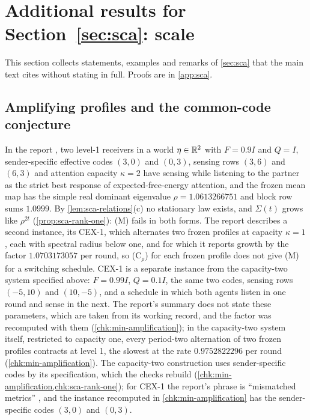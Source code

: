 \section{Additional results for \texorpdfstring{Section~\ref{sec:sca}}{Section 8}: scale}\label{sup:sca}

This section collects statements, examples and remarks of \cref{sec:sca} that the main text cites without stating in full. Proofs are in \cref{app:sca}.

\subsection{Amplifying profiles and the common-code conjecture}\label{sup:sca-amplifying-profiles-and-the-common-code}

\begin{example}\label{ex:sca-amplifying-profile}
In the report \citep{dennis2026communicating}, two level-1 receivers in a world $\eta\in\mathbb{R}^2$ with $F=0.9I$ and $Q=I$, sender-specific effective codes $(3,0)$ and $(0,3)$, sensing rows $(3,6)$ and $(6,3)$ and attention capacity $\kappa=2$ have sensing while listening to the partner as the strict best response of expected-free-energy attention, and the frozen mean map has the simple real dominant eigenvalue $\rho=1.0613266751$ and block row sums $1.0999$. By \cref{lem:sca-relations}(c) no stationary law exists, and $\Sigma(t)$ grows like $\rho^{2t}$ (\cref{prop:sca-rank-one}): \textup{(M)} fails in both forms. The report describes a second instance, its CEX-1, which alternates two frozen profiles at capacity $\kappa=1$, each with spectral radius below one, and for which it reports growth by the factor $1.0703173057$ per round, so \textup{(C$_\rho$)} for each frozen profile does not give \textup{(M)} for a switching schedule. CEX-1 is a separate instance from the capacity-two system specified above: $F=0.99I$, $Q=0.1I$, the same two codes, sensing rows $(-5,10)$ and $(10,-5)$, and a schedule in which both agents listen in one round and sense in the next. The report's summary does not state these parameters, which are taken from its working record, and the factor was recomputed with them (\cref{chk:min-amplification}); in the capacity-two system itself, restricted to capacity one, every period-two alternation of two frozen profiles contracts at level 1, the slowest at the rate $0.9752822296$ per round (\cref{chk:min-amplification}). The capacity-two construction uses sender-specific codes by its specification, which the checks rebuild (\cref{chk:min-amplification,chk:sca-rank-one}); for CEX-1 the report's phrase is ``mismatched metrics'' \citep{dennis2026communicating}, and the instance recomputed in \cref{chk:min-amplification} has the sender-specific codes $(3,0)$ and $(0,3)$.
\end{example}

